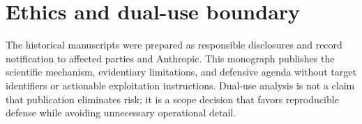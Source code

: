 \section{Ethics and dual-use boundary}
The historical manuscripts were prepared as responsible disclosures and record notification to affected parties and Anthropic. This monograph publishes the scientific mechanism, evidentiary limitations, and defensive agenda without target identifiers or actionable exploitation instructions. Dual-use analysis is not a claim that publication eliminates risk; it is a scope decision that favors reproducible defense while avoiding unnecessary operational detail.

